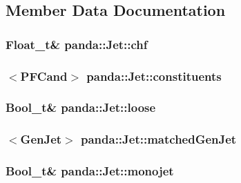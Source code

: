 \subsection{Member Data Documentation}
\hypertarget{classpanda_1_1Jet_a5992d4f72161327826d8964f821d73c1}{
\subsubsection[{chf}]{\setlength{\rightskip}{0pt plus 5cm}Float\_\-t\& {\bf panda::Jet::chf}}}
\label{classpanda_1_1Jet_a5992d4f72161327826d8964f821d73c1}
\hypertarget{classpanda_1_1Jet_a2a5f720652ecdc5eac264d4348bbc260}{
\subsubsection[{constituents}]{$<${\bf PFCand}$>$ {\bf panda::Jet::constituents}}}
\label{classpanda_1_1Jet_a2a5f720652ecdc5eac264d4348bbc260}
\hypertarget{classpanda_1_1Jet_a30b310e2462a14c5c61ab8ce42a4bbbe}{
\subsubsection[{loose}]{\setlength{\rightskip}{0pt plus 5cm}Bool\_\-t\& {\bf panda::Jet::loose}}}
\label{classpanda_1_1Jet_a30b310e2462a14c5c61ab8ce42a4bbbe}
\hypertarget{classpanda_1_1Jet_a793b39f86d443e064ed6b347a7e179e5}{
\subsubsection[{matchedGenJet}]{$<${\bf GenJet}$>$ {\bf panda::Jet::matchedGenJet}}}
\label{classpanda_1_1Jet_a793b39f86d443e064ed6b347a7e179e5}
\hypertarget{classpanda_1_1Jet_af46ae28622a72d41a644b5fa57164e98}{
\subsubsection[{monojet}]{\setlength{\rightskip}{0pt plus 5cm}Bool\_\-t\& {\bf panda::Jet::monojet}}}
